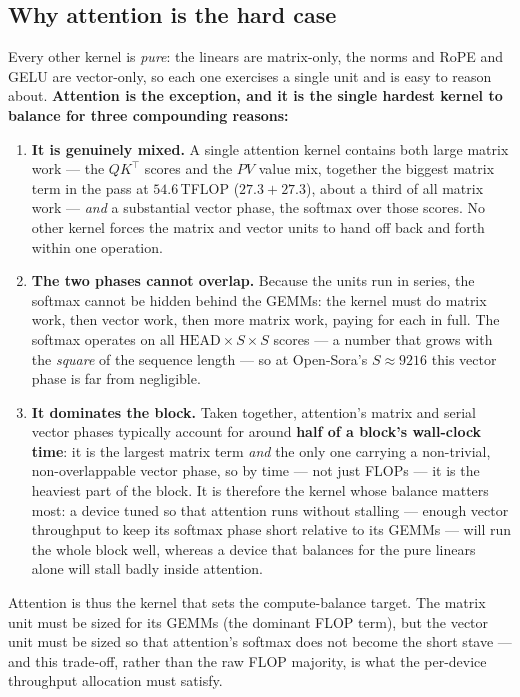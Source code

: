 \documentclass[11pt]{report}
\begin{document}
\subsection{Why attention is the hard case}

Every other kernel is \emph{pure}: the linears are matrix-only, the norms
and RoPE and GELU are vector-only, so each one exercises a single unit and
is easy to reason about. \textbf{Attention is the exception, and it is the
single hardest kernel to balance for three compounding reasons:}

\begin{enumerate}
\item \textbf{It is genuinely mixed.} A single attention kernel contains
both large matrix work --- the $QK^\top$ scores and the $PV$ value mix,
together the biggest matrix term in the pass at $54.6$\,TFLOP ($27.3+27.3$),
about a third of all matrix work --- \emph{and} a substantial vector phase,
the softmax over those scores. No other kernel forces the matrix and vector
units to hand off back and forth within one operation.
\item \textbf{The two phases cannot overlap.} Because the units run in
series, the softmax cannot be hidden behind the GEMMs: the kernel must do
matrix work, then vector work, then more matrix work, paying for each in
full. The softmax operates on all $\text{HEAD}\times S \times S$ scores ---
a number that grows with the \emph{square} of the sequence length --- so at
Open-Sora's $S\approx9216$ this vector phase is far from negligible.
\item \textbf{It dominates the block.} Taken together, attention's matrix
and serial vector phases typically account for around \textbf{half of a
block's wall-clock time}: it is the largest matrix term \emph{and} the only
one carrying a non-trivial, non-overlappable vector phase, so by time --- not
just FLOPs --- it is the heaviest part of the block. It is therefore the
kernel whose balance matters most: a device tuned so that attention runs
without stalling --- enough vector throughput to keep its softmax phase
short relative to its GEMMs --- will run the whole block well, whereas a
device that balances for the pure linears alone will stall badly inside
attention.
\end{enumerate}

Attention is thus the kernel that sets the compute-balance target. The
matrix unit must be sized for its GEMMs (the dominant FLOP term), but the
vector unit must be sized so that attention's softmax does not become the
short stave --- and this trade-off, rather than the raw FLOP majority, is
what the per-device throughput allocation must satisfy.
\end{document}
